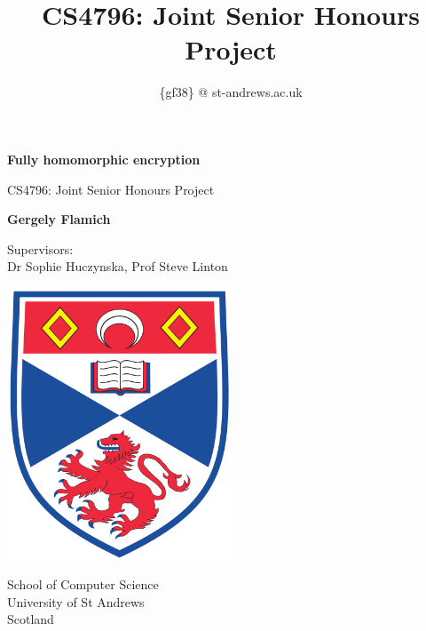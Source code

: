 \documentclass{article}
\title{CS4796: Joint Senior Honours Project}
\author{\{gf38\} @ st-andrews.ac.uk}
\theoremstyle{definition}
\theoremstyle{example}
\begin{document}
\begin{titlepage}
    \begin{center}
        \vspace*{1cm}
        
        \textbf{Fully homomorphic encryption}
        
        \vspace{0.5cm}
        
        CS4796: Joint Senior Honours Project \\
                
        
        \vspace{1cm}
        
        \textbf{Gergely Flamich}

        \vspace{0.5cm}
        Supervisors:\\
        Dr Sophie Huczynska, Prof Steve Linton
        
        \vfill
        
        \includegraphics[width=0.5\textwidth]{img/uni_crest}
        
        \vspace{0.8cm}
        
        School of Computer Science\\
        University of St Andrews\\
        Scotland\\
        
    \end{center}
\end{titlepage}

\begin{abstract}
\end{abstract}
\end{document}
